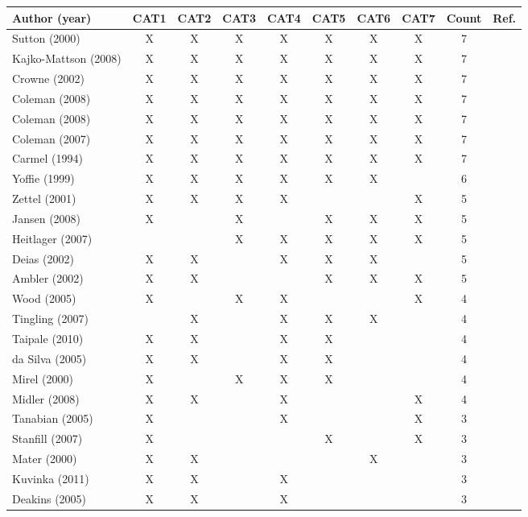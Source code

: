 \documentclass[12pt,journal,compsoc]{../sty/IEEEtran}
\begin{document}
\begin{table}[!t]
\begin{figure}[!t]
\begin{compactitem}
\begin{table}[!t]
\begin{tabular}{|l||c||c||c||c||c||c||c||c||c|}
\hline Author (year) & CAT1 & CAT2 & CAT3 & CAT4 & CAT5 & CAT6 & CAT7 & Count &
Ref. \\ \hline Sutton (2000) & X & X & X & X & X & X & X & 7 & \cite{Sutton2000}
\\ Kajko-Mattson (2008) & X & X & X & X & X & X & X & 7 &  \cite{Kajko-
Mattsson2008} \\ Crowne (2002) & X & X & X & X & X & X & X & 7 &
\cite{Crowne2002} \\ Coleman (2008) & X & X & X & X & X & X & X & 7 &
\cite{Coleman2008a} \\ Coleman (2008) & X & X & X & X & X & X & X & 7 &
\cite{Coleman2008} \\ Coleman (2007) & X & X & X & X & X & X & X & 7 &
\cite{Coleman2007} \\ Carmel (1994) & X & X & X & X & X & X & X & 7 &
\cite{Camel1994a} \\ Yoffie (1999) & X & X & X & X & X & X & & 6 &
\cite{Yoffie1999} \\ Zettel (2001) & X & X & X & X & & & X & 5 &
\cite{Zettel2001} \\ Jansen (2008) & X & & X & & X & X & X & 5 &
\cite{Jansen2008} \\ Heitlager (2007) &  &  & X & X & X & X & X & 5 &
\cite{Heitlager2007} \\ Deias (2002) & X & X & & X & X & X & & 5 & \cite{Deias}
\\ Ambler (2002) & X & X &  &  & X & X & X & 5 & \cite{Ambler2002} \\ Wood
(2005) & X &  & X  & X &  &  & X & 4 & \cite{Wood2005} \\ Tingling (2007) &  & X
&  & X & X & X &  & 4 & \cite{Tingling2007} \\ Taipale (2010) & X & X &  & X & X
&  &  & 4 & \cite{Taipale2010} \\ da Silva (2005) & X & X &  & X & X &  &  & 4 &
\cite{Silva2005} \\ Mirel (2000) & X &  & X & X & X &  &  & 4 & \cite{Mirel2000}
\\ Midler (2008) & X & X &  & X &  &  & X & 4 & \cite{Midler2008} \\ Tanabian
(2005) & X &  &  & X &  &  & X  & 3 & \cite{Tanabian2005} \\ Stanfill (2007) & X
&  &  &  & X &  & X & 3 & \cite{Stanfill2007} \\ Mater (2000) & X & X &  &  &  &
X &  & 3 & \cite{Mater2000} \\ Kuvinka (2011) & X & X &  & X &  &  &  & 3 &
\cite{Kuvinka2011} \\ Deakins (2005) & X & X &  & X &  &  &  & 3 &

\end{tabular}
\end{table}
\end{compactitem}
\end{figure}
\end{table}
\end{document}
